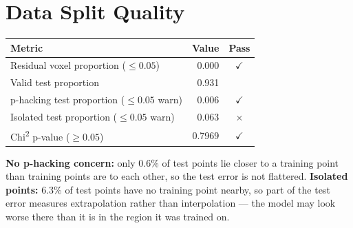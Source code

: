 \documentclass[9pt,a4paper]{article}
\begin{document}
\section{Data Split Quality}
\begin{minipage}{\linewidth}
\renewcommand{\arraystretch}{1.2}
\begin{tabular}{|l|r|c|}
  \hline\textbf{Metric} & \textbf{Value} & \textbf{Pass} \\ \hline
  Residual voxel proportion ($\leq\!0.05$) & 0.000 & \cellcolor{passgreen}$\checkmark$ \\ \hline
  Valid test proportion & 0.931 & \\ \hline
  p-hacking test proportion ($\leq\!0.05$ warn) & 0.006 & \cellcolor{passgreen}$\checkmark$ \\ \hline
  Isolated test proportion ($\leq\!0.05$ warn) & 0.063 & \cellcolor{failred}$\times$ \\ \hline
  Chi\textsuperscript{2} p-value ($\geq\!0.05$) & 0.7969 & \cellcolor{passgreen}$\checkmark$ \\ \hline
\end{tabular}
\end{minipage}
\textcolor{passgreen!60!black}{\textbf{No p-hacking concern:}} only 0.6\% of test points lie closer to a training point than training points are to each other, so the test error is not flattered. \textcolor{failred!70!black}{\textbf{Isolated points:}} 6.3\% of test points have no training point nearby, so part of the test error measures extrapolation rather than interpolation --- the model may look worse there than it is in the region it was trained on.
\end{document}
